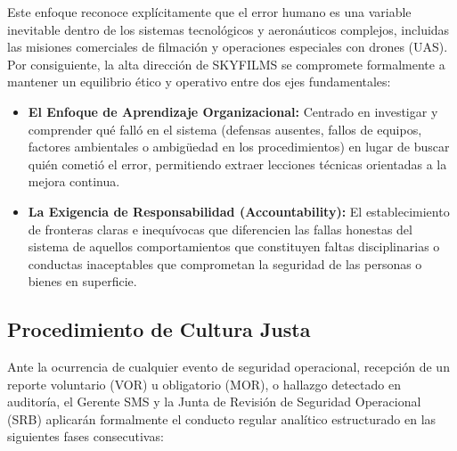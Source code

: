 Este enfoque reconoce explícitamente que el error humano es una variable inevitable dentro de los sistemas tecnológicos y aeronáuticos complejos, incluidas las misiones comerciales de filmación y operaciones especiales con drones (UAS). Por consiguiente, la alta dirección de SKYFILMS se compromete formalmente a mantener un equilibrio ético y operativo entre dos ejes fundamentales:

\begin{itemize}
    \item \textbf{El Enfoque de Aprendizaje Organizacional:} Centrado en investigar y comprender qué falló en el sistema (defensas ausentes, fallos de equipos, factores ambientales o ambigüedad en los procedimientos) en lugar de buscar quién cometió el error, permitiendo extraer lecciones técnicas orientadas a la mejora continua.

    \item \textbf{La Exigencia de Responsabilidad (Accountability):} El establecimiento de fronteras claras e inequívocas que diferencien las fallas honestas del sistema de aquellos comportamientos que constituyen faltas disciplinarias o conductas inaceptables que comprometan la seguridad de las personas o bienes en superficie.
\end{itemize}

\subsection{Procedimiento de Cultura Justa}
 Ante la ocurrencia de cualquier evento de seguridad operacional, recepción de un reporte voluntario (VOR) u obligatorio (MOR), o hallazgo detectado en auditoría, el Gerente SMS y la Junta de Revisión de Seguridad Operacional (SRB) aplicarán formalmente el conducto regular analítico estructurado en las siguientes fases consecutivas:

 
\renewcommand{\arraystretch}{1.4}
\setlength{\tabcolsep}{4pt}
 
